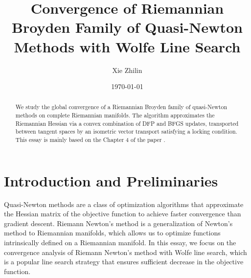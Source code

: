 \documentclass[12pt,a4paper,draft]{article}  %
\title{Convergence of Riemannian Broyden Family of Quasi-Newton Methods with Wolfe Line Search}
\author{Xie Zhilin}
\date{\today}
\newcounter{cite}
\theoremstyle{definition}
\numberwithin{equation}{section}
\begin{document}
\maketitle
\begin{abstract}
We study the global convergence of a Riemannian Broyden family of quasi-Newton methods on complete Riemannian manifolds. The algorithm approximates the Riemannian Hessian via a convex combination of DFP and BFGS updates, transported between tangent spaces by an isometric vector transport satisfying a locking condition. This essay is mainly based on the Chapter 4 of the paper \cite{Huangw2013}.
\end{abstract}
\tableofcontents
\section{Introduction and Preliminaries}
Quasi-Newton methods are a class of optimization algorithms that approximate the Hessian matrix of the objective function to achieve faster convergence than gradient descent. Riemann Newton's method is a generalization of Newton's method to Riemannian manifolds, which allows us to optimize functions intrinsically defined on a Riemannian manifold. In this essay, we focus on the convergence analysis of Riemann Newton's method with Wolfe line search, which is a popular line search strategy that ensures sufficient decrease in the objective function.
\end{document}
